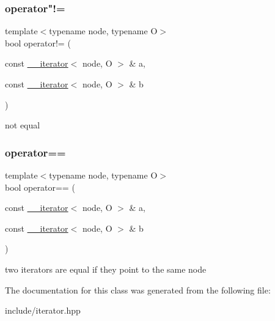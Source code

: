 \subsubsection{\texorpdfstring{operator"!=}{operator!=}}
{\footnotesize\ttfamily template$<$typename node, typename O$>$ \\
bool operator!= (\begin{DoxyParamCaption}\item[{const \hyperlink{classAP__it_1_1____iterator}{\+\_\+\+\_\+iterator}$<$ node, O $>$ \&}]{a,  }\item[{const \hyperlink{classAP__it_1_1____iterator}{\+\_\+\+\_\+iterator}$<$ node, O $>$ \&}]{b }\end{DoxyParamCaption})\hspace{0.3cm}{\ttfamily [friend]}}

not equal \mbox{\label{classAP__it_1_1____iterator_a2e5014cb825532053115734598e16318}} 
\subsubsection{\texorpdfstring{operator==}{operator==}}
{\footnotesize\ttfamily template$<$typename node, typename O$>$ \\
bool operator== (\begin{DoxyParamCaption}\item[{const \hyperlink{classAP__it_1_1____iterator}{\+\_\+\+\_\+iterator}$<$ node, O $>$ \&}]{a,  }\item[{const \hyperlink{classAP__it_1_1____iterator}{\+\_\+\+\_\+iterator}$<$ node, O $>$ \&}]{b }\end{DoxyParamCaption})\hspace{0.3cm}{\ttfamily [friend]}}

two iterators are equal if they point to the same node 

The documentation for this class was generated from the following file\+:\begin{DoxyCompactItemize}
\item 
include/iterator.\+hpp\end{DoxyCompactItemize}
